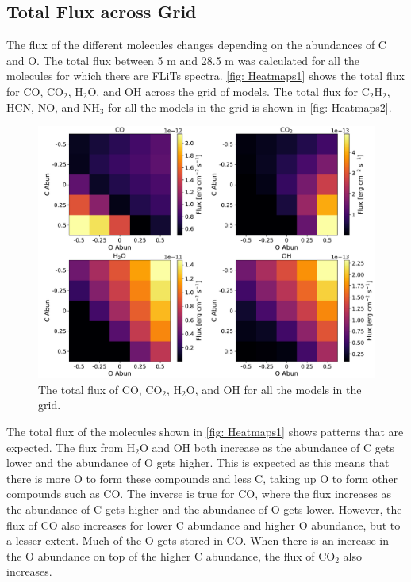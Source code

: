\documentclass[oneside, single, authoryear, semicolon, 12pt]{lion-msc}
\newcommand{\4}{$_4$}
\newcommand{\3}{$_3$}
\newcommand{\2}{$_2$}
\begin{document}
\subsection{Total Flux across Grid}
The flux of the different molecules changes depending on the abundances of C and O. The total flux between 5 \textmu m and 28.5 \textmu m was calculated for all the molecules for which there are FLiTs spectra. \autoref{fig: Heatmaps1} shows the total flux for CO, CO\2, H\2O, and OH across the grid of models. The total flux for C\2H\2, HCN, NO, and NH\3 for all the models in the grid is shown in \autoref{fig: Heatmaps2}. 

\begin{figure}[H]
    \centering
    \includegraphics[width=\linewidth]{Figures/Heatmaps1.pdf}
    \caption{The total flux of CO, CO\2, H\2O, and OH for all the models in the grid.}
    \label{fig: Heatmaps1}
\end{figure}

The total flux of the molecules shown in \autoref{fig: Heatmaps1} shows patterns that are expected. The flux from H\2O and OH both increase as the abundance of C gets lower and the abundance of O gets higher. This is expected as this means that there is more O to form these compounds and less C, taking up O to form other compounds such as CO. The inverse is true for CO, where the flux increases as the abundance of C gets higher and the abundance of O gets lower. However, the flux of CO also increases for lower C abundance and higher O abundance, but to a lesser extent.  Much of the O gets stored in CO. When there is an increase in the O abundance on top of the higher C abundance, the flux of CO\2 also increases. 
\end{document}
